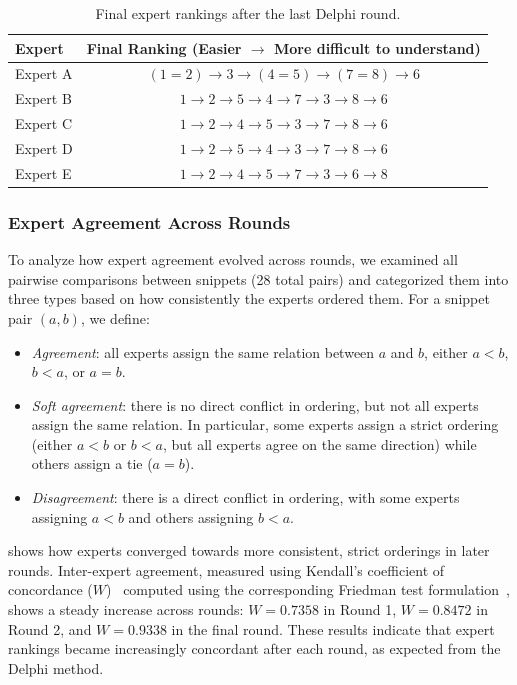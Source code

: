 \begin{table}[t]
\centering
\caption{Final expert rankings after the last Delphi round.} \small
\begin{tabular}{lc}
\toprule
\textbf{Expert} & \textbf{Final Ranking (Easier $\rightarrow$ More difficult to understand)} \\
\midrule
Expert A & $(1 = 2) \rightarrow 3 \rightarrow (4 = 5) \rightarrow (7 = 8) \rightarrow 6$ \\
Expert B & $1 \rightarrow 2 \rightarrow 5 \rightarrow 4 \rightarrow 7 \rightarrow 3 \rightarrow 8 \rightarrow 6$ \\
Expert C & $1 \rightarrow 2 \rightarrow 4 \rightarrow 5 \rightarrow 3 \rightarrow 7 \rightarrow 8 \rightarrow 6$ \\
Expert D & $1 \rightarrow 2 \rightarrow 5 \rightarrow 4 \rightarrow 3 \rightarrow 7 \rightarrow 8 \rightarrow 6$ \\
Expert E & $1 \rightarrow 2 \rightarrow 4 \rightarrow 5 \rightarrow 7 \rightarrow 3 \rightarrow 6 \rightarrow 8$ \\
\bottomrule
\end{tabular}
\label{tab:final_expert_rankings}
\end{table}






\subsubsection{Expert Agreement Across Rounds}
\label{sec:delphi_agreement}

To analyze how expert agreement evolved across rounds, we examined all pairwise comparisons between snippets (28 total pairs) and categorized them into three types based on how consistently the experts ordered them. For a snippet pair $(a, b)$, we define:
\begin{itemize}
	\item \textit{Agreement}: all experts assign the same relation between $a$ and $b$, either $a < b$, $b < a$, or $a = b$.
	
	\item \textit{Soft agreement}: there is no direct conflict in ordering, but not all experts assign the same relation. In particular, some experts assign a strict ordering (either $a < b$ or $b < a$, but all experts agree on the same direction) while others assign a tie ($a = b$). 

	\item \textit{Disagreement}: there is a direct conflict in ordering, with some experts assigning $a < b$ and others assigning $b < a$.
\end{itemize}
 shows how experts converged towards more consistent, strict orderings in later rounds.
Inter-expert agreement, measured using Kendall’s coefficient of concordance ($W$)~\cite{kendall1939distribution} computed using the corresponding Friedman test formulation~\cite{friedman1937use}, shows a steady increase across rounds: $W = 0.7358$ in Round 1, $W = 0.8472$ in Round 2, and $W = 0.9338$ in the final round. These results indicate that expert rankings became increasingly concordant after each round, as expected from the Delphi method.

